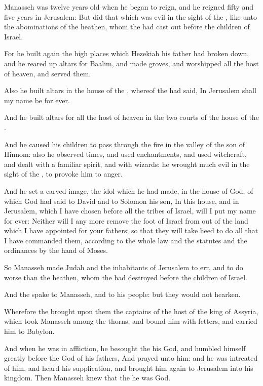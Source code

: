 \Chapter
\Verse Manasseh was twelve years old when he began to reign, and he reigned fifty and five years in Jerusalem: \Verse But did that which was evil in the sight of the \LORD, like unto the abominations of the heathen, whom the \LORD had cast out before the children of Israel.

\Verse For he built again the high places which Hezekiah his father had broken down, and he reared up altars for Baalim, and made groves, and worshipped all the host of heaven, and served them.

\Verse Also he built altars in the house of the \LORD, whereof the \LORD had said, In Jerusalem shall my name be for ever.

\Verse And he built altars for all the host of heaven in the two courts of the house of the \LORD.

\Verse And he caused his children to pass through the fire in the valley of the son of Hinnom: also he observed times, and used enchantments, and used witchcraft, and dealt with a familiar spirit, and with wizards: he wrought much evil in the sight of the \LORD, to provoke him to anger.

\Verse And he set a carved image, the idol which he had made, in the house of God, of which God had said to David and to Solomon his son, In this house, and in Jerusalem, which I have chosen before all the tribes of Israel, will I put my name for ever: \Verse Neither will I any more remove the foot of Israel from out of the land which I have appointed for your fathers; so that they will take heed to do all that I have commanded them, according to the whole law and the statutes and the ordinances by the hand of Moses.

\Verse So Manasseh made Judah and the inhabitants of Jerusalem to err, and to do worse than the heathen, whom the \LORD had destroyed before the children of Israel.

\Verse And the \LORD spake to Manasseh, and to his people: but they would not hearken.

\Verse Wherefore the \LORD brought upon them the captains of the host of the king of Assyria, which took Manasseh among the thorns, and bound him with fetters, and carried him to Babylon.

\Verse And when he was in affliction, he besought the \LORD his God, and humbled himself greatly before the God of his fathers, \Verse And prayed unto him: and he was intreated of him, and heard his supplication, and brought him again to Jerusalem into his kingdom.  Then Manasseh knew that the \LORD he was God.

